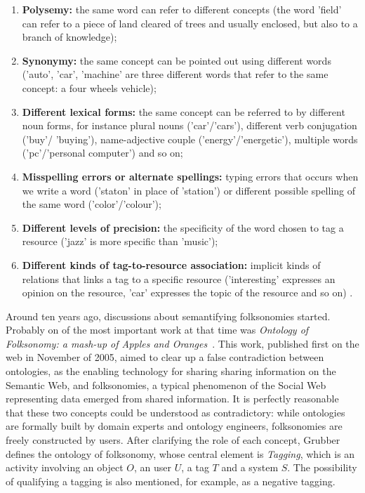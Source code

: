 \begin{citacao}
\begin{enumerate}
\item \textbf{Polysemy:} the same word can refer to different concepts (the word ’field’ can refer to a piece of land cleared of trees and usually enclosed, but also to a branch of knowledge);
\item \textbf{Synonymy:} the same concept can be pointed out using different words (’auto’, ’car’, ’machine’ are three different words that refer to the same concept: a four wheels vehicle);
\item \textbf{Different lexical forms:} the same concept can be referred to by different noun forms, for instance plural nouns (’car’/’cars’), different verb conjugation (’buy’/ ’buying’), name-adjective couple (’energy’/’energetic’), multiple words (’pc’/’personal computer’) and so on;
\item \textbf{Misspelling errors or alternate spellings:} typing errors that occurs when we write a word (’staton’ in place of ’station’) or different possible spelling of the same word (’color’/’colour’);
\item \textbf{Different levels of precision:} the specificity of the word chosen to tag a resource (’jazz’ is more specific than ’music’);
\item \textbf{Different kinds of tag-to-resource association:} implicit kinds of relations that links a tag to a specific resource (’interesting’ expresses an opinion on the resource, ’car’ expresses the topic of the resource and so on) \cite[p.2]{Marchetti2007}.
\end{enumerate}
\end{citacao}

Around ten years ago, discussions about semantifying folksonomies started.
Probably on of the most important work at that time was \emph{Ontology of Folksonomy: a mash-up of Apples and Oranges}~\cite{Grubber2007}.
This work, published first on the web in November of 2005, aimed to clear up a false contradiction between ontologies, as the enabling technology for sharing sharing information on the Semantic Web, and folksonomies, a typical phenomenon of the Social Web representing data emerged from shared information.
It is perfectly reasonable that these two concepts could be understood as contradictory: while ontologies are formally built by domain experts and ontology engineers, folksonomies are freely constructed by users.
After clarifying the role of each concept, Grubber defines the ontology of folksonomy, whose central element is \emph{Tagging}, which is an activity involving an object $O$, an user $U$, a tag $T$ and a system $S$.
The possibility of qualifying a tagging is also mentioned, for example, as a negative tagging.

